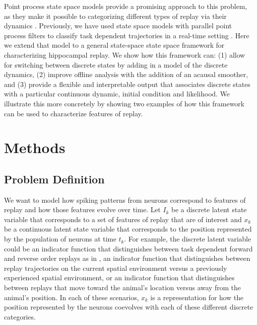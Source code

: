 \documentclass[conference]{IEEEtran}
\begin{document}
Point process state space models provide a promising approach to this problem, as they make it possible to categorizing different types of replay via their dynamics \cite{DengRapidclassificationhippocampal2016, EdenCharacterizingComplexMultiScale2018}. Previously, we have used state space models with parallel point process filters to classify task dependent trajectories in a real-time setting \cite{DengRapidclassificationhippocampal2016}. Here we extend that model to a general state-space state space framework for characterizing hippocampal replay. We show how this framework can: (1) allow for switching between discrete states by adding in a model of the discrete dynamics, (2) improve offline analysis with the addition of an acausal smoother, and (3) provide a flexible and interpretable output that associates  discrete states with a particular continuous dynamic, initial condition and likelihood. We illustrate this more concretely by showing two examples of how this framework can be used to characterize features of replay.

\section{Methods}
\subsection{Problem Definition}
We want to model how spiking patterns from neurons correspond to features of replay and how those features evolve over time. Let $I_{k}$ be a discrete latent state variable that corresponds to a set of features of replay that are of interest and $x_{k}$ be a continuous latent state variable that corresponds to the position represented by the population of neurons at time $t_{k}$. For example, the discrete latent variable could be an indicator function that distinguishes between task dependent forward and reverse order replays as in \cite{DengRapidclassificationhippocampal2016}, an indicator function that distinguishes between replay trajectories on the current spatial environment versus a previously experienced spatial environment, or an indicator function that distinguishes between replays that move toward the animal's location versus away from the animal's position. In each of these scenarios, $x_{k}$ is a representation for how the position represented by the neurons coevolves with each of these different discrete categories.
\end{document}
